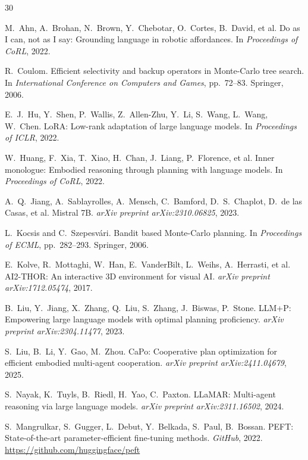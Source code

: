 \documentclass[pdflatex,sn-mathphys-num]{sn-jnl}
\theoremstyle{thmstyleone}
\theoremstyle{thmstyletwo}
\theoremstyle{thmstylethree}
\begin{document}
\begin{thebibliography}{30}

M.~Ahn, A.~Brohan, N.~Brown, Y.~Chebotar, O.~Cortes, B.~David, et al.
Do as I can, not as I say: Grounding language in robotic affordances.
In \textit{Proceedings of CoRL}, 2022.

R.~Coulom.
Efficient selectivity and backup operators in Monte-Carlo tree search.
In \textit{International Conference on Computers and Games},
pp.~72--83. Springer, 2006.

E.~J.~Hu, Y.~Shen, P.~Wallis, Z.~Allen-Zhu, Y.~Li, S.~Wang,
L.~Wang, W.~Chen.
LoRA: Low-rank adaptation of large language models.
In \textit{Proceedings of ICLR}, 2022.

W.~Huang, F.~Xia, T.~Xiao, H.~Chan, J.~Liang, P.~Florence, et al.
Inner monologue: Embodied reasoning through planning with language
models.
In \textit{Proceedings of CoRL}, 2022.

A.~Q.~Jiang, A.~Sablayrolles, A.~Mensch, C.~Bamford,
D.~S.~Chaplot, D.~de las Casas, et al.
Mistral 7B.
\textit{arXiv preprint arXiv:2310.06825}, 2023.

L.~Kocsis and C.~Szepesv\'{a}ri.
Bandit based Monte-Carlo planning.
In \textit{Proceedings of ECML}, pp.~282--293. Springer, 2006.

E.~Kolve, R.~Mottaghi, W.~Han, E.~VanderBilt, L.~Weihs,
A.~Herrasti, et al.
AI2-THOR: An interactive 3D environment for visual AI.
\textit{arXiv preprint arXiv:1712.05474}, 2017.

B.~Liu, Y.~Jiang, X.~Zhang, Q.~Liu, S.~Zhang, J.~Biswas, P.~Stone.
LLM+P: Empowering large language models with optimal planning
proficiency.
\textit{arXiv preprint arXiv:2304.11477}, 2023.

S.~Liu, B.~Li, Y.~Gao, M.~Zhou.
CaPo: Cooperative plan optimization for efficient embodied multi-agent
cooperation.
\textit{arXiv preprint arXiv:2411.04679}, 2025.

S.~Nayak, K.~Tuyls, B.~Riedl, H.~Yao, C.~Paxton.
LLaMAR: Multi-agent reasoning via large language models.
\textit{arXiv preprint arXiv:2311.16502}, 2024.

S.~Mangrulkar, S.~Gugger, L.~Debut, Y.~Belkada, S.~Paul, B.~Bossan.
PEFT: State-of-the-art parameter-efficient fine-tuning methods.
\textit{GitHub}, 2022.
\url{https://github.com/huggingface/peft}


\end{thebibliography}
\end{document}
